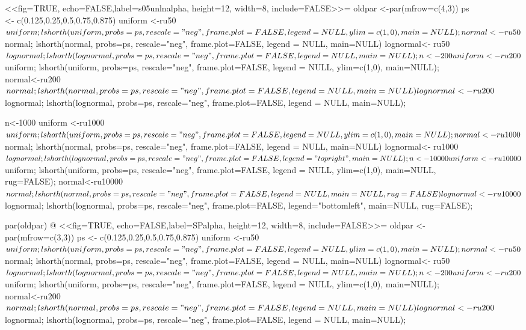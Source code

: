 \documentclass[dvips,12pt,a4paper,twoside]{amsart}
\begin{document}
\begin{figure}[htb]
<<fig=TRUE, echo=FALSE,label=s05unlnalpha, height=12, width=8, include=FALSE>>=
oldpar <-par(mfrow=c(4,3))
ps <- c(0.125,0.25,0.5,0.75,0.875)
uniform <-ru50$uniform;  lshorth(uniform, probs=ps,  rescale="neg",  frame.plot=FALSE, 
legend = NULL,  ylim=c(1,0), main=NULL);
normal<-ru50$normal; lshorth(normal, probs=ps,  rescale="neg", frame.plot=FALSE,  legend = NULL, main=NULL)
lognormal<- ru50$lognormal; lshorth(lognormal, probs=ps,  rescale="neg", frame.plot=FALSE,  legend =NULL, main=NULL);

n<-200
uniform <-ru200$uniform;  lshorth(uniform, probs=ps,  rescale="neg",  frame.plot=FALSE, 
legend = NULL,  ylim=c(1,0), main=NULL);
normal<-ru200$normal; lshorth(normal, probs=ps,  rescale="neg", frame.plot=FALSE,  legend = NULL, main=NULL)
lognormal<- ru200$lognormal; lshorth(lognormal, probs=ps,  rescale="neg", frame.plot=FALSE,  legend = NULL, main=NULL);


n<-1000
uniform <-ru1000$uniform;  lshorth(uniform, probs=ps,  rescale="neg",  frame.plot=FALSE, 
legend = NULL,  ylim=c(1,0), main=NULL);
normal<-ru1000$normal; lshorth(normal, probs=ps,  rescale="neg", frame.plot=FALSE,  legend = NULL, main=NULL)
lognormal<- ru1000$lognormal; lshorth(lognormal, probs=ps,  rescale="neg", frame.plot=FALSE,  legend = "topright", main=NULL);

n<-10000
uniform <-ru10000$uniform;  lshorth(uniform, probs=ps,  rescale="neg", frame.plot=FALSE, 
legend = NULL,  ylim=c(1,0), main=NULL, rug=FALSE);
normal<-ru10000$normal; lshorth(normal, probs=ps,  rescale="neg", frame.plot=FALSE,  legend = NULL, main=NULL, rug=FALSE)
lognormal<- ru10000$lognormal; lshorth(lognormal, probs=ps,  rescale="neg", frame.plot=FALSE, legend="bottomleft", main=NULL, rug=FALSE);


par(oldpar)
@
<<fig=TRUE, echo=FALSE,label=SPalpha, height=12, width=8, include=FALSE>>=
oldpar <-par(mfrow=c(3,3))
ps <- c(0.125,0.25,0.5,0.75,0.875)
uniform <-ru50$uniform;  lshorth(uniform, probs=ps,  rescale="neg",  frame.plot=FALSE, 
legend = NULL,  ylim=c(1,0), main=NULL);
normal<-ru50$normal; lshorth(normal, probs=ps,  rescale="neg", frame.plot=FALSE,  legend = NULL, main=NULL)
lognormal<- ru50$lognormal; lshorth(lognormal, probs=ps,  rescale="neg", frame.plot=FALSE,  legend =NULL, main=NULL);

n<-200
uniform <-ru200$uniform;  lshorth(uniform, probs=ps,  rescale="neg",  frame.plot=FALSE, 
legend = NULL,  ylim=c(1,0), main=NULL);
normal<-ru200$normal; lshorth(normal, probs=ps,  rescale="neg", frame.plot=FALSE,  legend = NULL, main=NULL)
lognormal<- ru200$lognormal; lshorth(lognormal, probs=ps,  rescale="neg", frame.plot=FALSE,  legend = NULL, main=NULL);


\end{figure}
\end{document}
